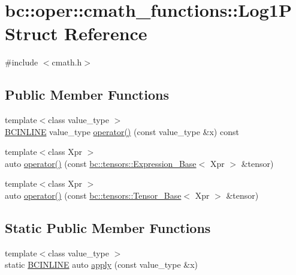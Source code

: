 \hypertarget{structbc_1_1oper_1_1cmath__functions_1_1Log1P}{}\section{bc\+:\+:oper\+:\+:cmath\+\_\+functions\+:\+:Log1P Struct Reference}
\label{structbc_1_1oper_1_1cmath__functions_1_1Log1P}


{\ttfamily \#include $<$cmath.\+h$>$}

\subsection*{Public Member Functions}
\begin{DoxyCompactItemize}
\item 
{\footnotesize template$<$class value\+\_\+type $>$ }\\\hyperlink{common_8h_a6699e8b0449da5c0fafb878e59c1d4b1}{B\+C\+I\+N\+L\+I\+NE} value\+\_\+type \hyperlink{structbc_1_1oper_1_1cmath__functions_1_1Log1P_a913edb05459b7644dc8354ef92579c6f}{operator()} (const value\+\_\+type \&x) const
\item 
{\footnotesize template$<$class Xpr $>$ }\\auto \hyperlink{structbc_1_1oper_1_1cmath__functions_1_1Log1P_a62c752e35e066b731f89babc6f456c6f}{operator()} (const \hyperlink{classbc_1_1tensors_1_1Expression__Base}{bc\+::tensors\+::\+Expression\+\_\+\+Base}$<$ Xpr $>$ \&tensor)
\item 
{\footnotesize template$<$class Xpr $>$ }\\auto \hyperlink{structbc_1_1oper_1_1cmath__functions_1_1Log1P_a0f6da7067eb60ebb9efce890a02ecc9b}{operator()} (const \hyperlink{classbc_1_1tensors_1_1Tensor__Base}{bc\+::tensors\+::\+Tensor\+\_\+\+Base}$<$ Xpr $>$ \&tensor)
\end{DoxyCompactItemize}
\subsection*{Static Public Member Functions}
\begin{DoxyCompactItemize}
\item 
{\footnotesize template$<$class value\+\_\+type $>$ }\\static \hyperlink{common_8h_a6699e8b0449da5c0fafb878e59c1d4b1}{B\+C\+I\+N\+L\+I\+NE} auto \hyperlink{structbc_1_1oper_1_1cmath__functions_1_1Log1P_a531afd3e8c84b4fbd946c4a82108f578}{apply} (const value\+\_\+type \&x)
\end{DoxyCompactItemize}


